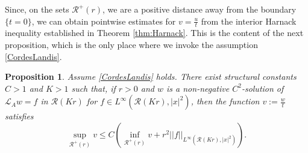 \documentclass[12pt]{amsart}
\newtheorem{Proposition}[Theorem]{Proposition}
\newcommand{\Lop}{\mathcal{L}}
\def \r {\mathcal R}
\begin{document}
Since, on the sets $\r^+(r)$,  we are a positive distance away from the boundary $\{t=0\}$, we can obtain pointwise estimates for $v=\frac{u}{t}$ from the interior Harnack inequality established in Theorem \ref{thm:Harnack}. This is the content of the next proposition, which is the only place where we invoke the assumption \eqref{CordesLandis}.

\begin{Proposition}\label{secondestimate}
Assume \eqref{CordesLandis} holds. There exist structural constants $C> 1$ and $K>1$ such that, if $r>0$ and $w$ is a non-negative $C^2$-solution of $\Lop_A w = f$ in $\r(Kr)$ for $f \in L^{\infty}(\r(Kr),|x|^2)$, then the function $v := \frac{w}{t}$ satisfies
\[
\sup_{\r^+(r)} v \leq C \left(\inf_{\r^+(r)} v + r^2  ||f||_{L^{\infty}(\r(Kr),|x|^2)}  \right).
\]
\end{Proposition}
\end{document}

